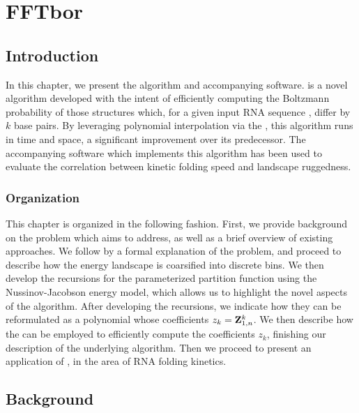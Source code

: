 
\chapter{FFTbor}
\label{ch:fftbor}


\section{Introduction}
\label{sec:fftbor:intro}

In this chapter, we present the \fftbor algorithm and accompanying software.
\fftbor is a novel algorithm developed with the intent of efficiently computing
the Boltzmann probability of those structures which, for a given input RNA
sequence \seq, differ by $k$ base pairs. By leveraging polynomial interpolation
via the \fft, this algorithm runs in  time and
 space, a significant improvement over its predecessor. The accompanying
software which implements this algorithm has been used to evaluate the
correlation between kinetic folding speed and landscape ruggedness.

\subsection{Organization}
\label{subsec:fftbor:org}

This chapter is organized in the following fashion. First, we provide
background on
the problem which \fftbor aims to address, as well as a brief overview of
existing approaches. We follow by a formal explanation of the problem, and
proceed to describe how the energy landscape is coarsified into discrete bins.
We then develop the recursions for the parameterized partition function using
the Nussinov-Jacobson energy model, which allows us to highlight the novel aspects
of the algorithm. After developing the recursions, we indicate how they can be
reformulated as a polynomial whose coefficients $z_k={\bf Z}^{k}_{1,n}$. We then
describe how the \fft can be employed to efficiently compute the coefficients
$z_k$, finishing our description of the underlying algorithm. Then we proceed
to present an application of \fftbor, in the area of RNA folding kinetics.

\section{Background}
\label{sec:fftbor:bkgrnd}

